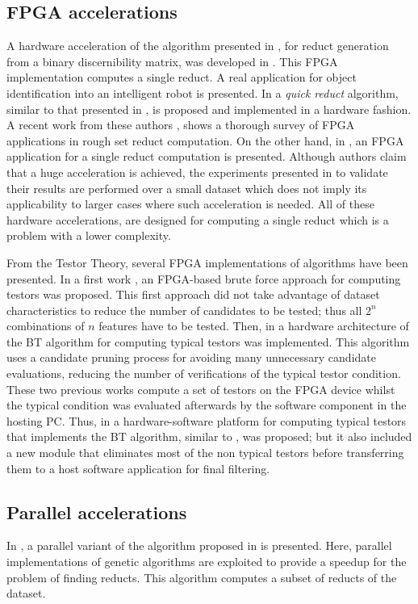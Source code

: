 \documentclass[citenumber]{elsarticle}
\begin{document}
\subsection{FPGA accelerations}\label{fpga}  
%
  	A hardware acceleration of the algorithm presented in \citep{Yang08}, for reduct generation from a binary discernibility matrix, was developed in \citep{Tiwari11,Tiwari12}. This FPGA implementation computes a single reduct. A real application for object identification into an intelligent robot is presented. In \citep{Tiwari13} a \emph{quick reduct} algorithm, similar to that presented in \citep{Chouchoulas01}, is proposed and implemented in a hardware fashion. A recent work from these authors \citep{Tiwari14}, shows a thorough survey of FPGA applications in rough set reduct computation. On the other hand, in \citep{Grzes13,Kopczynski14}, an FPGA application for a single reduct computation is presented. Although authors claim that a huge acceleration is achieved, the experiments presented in \citep{Kopczynski14} to validate their results are performed over a small dataset which does not imply its applicability to larger cases where such acceleration is needed. All of these hardware accelerations, are designed for computing a single reduct which is a problem with a lower complexity. 
  	 	
  	From the Testor Theory, several FPGA implementations of algorithms have been presented. In a first work \citep{Cumplido06}, an FPGA-based brute force approach for computing testors was proposed. This first approach did not take advantage of dataset characteristics to reduce the number of candidates to be tested; thus all $2^n$ combinations of $n$ features have to be tested. Then, in \citep{Rojas07} a hardware architecture of the BT algorithm for computing typical testors was implemented. This algorithm uses a candidate pruning process for avoiding many unnecessary candidate evaluations, reducing the number of verifications of the typical testor condition. These two previous works compute a set of testors on the FPGA device whilst the typical condition was evaluated afterwards by the software component in the hosting PC. Thus, in \citep{Rojas12} a hardware-software platform for computing typical testors that implements the BT algorithm, similar to \citep{Rojas07}, was proposed; but it also included a new module that eliminates most of the non typical testors before transferring them to a host software application for final filtering. 
  	
  	
%	
\subsection{Parallel accelerations}\label{parallel}
%
	In \citep{Wroblewski98}, a parallel variant of the algorithm proposed in \citep{Wroblewski95} is presented. Here, parallel implementations of genetic algorithms are exploited to provide a speedup for the problem of finding reducts. This algorithm computes a subset of reducts of the dataset.
	
\end{document}
